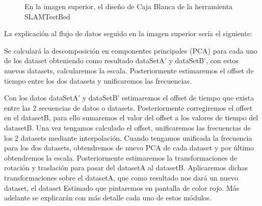 \begin{figure}[H]
\begin{center}
\hspace{0.5cm}
\end{center}
\caption{ En la imagen superior, el diseño de Caja Blanca de la herramienta SLAMTestBed }
\end{figure}

La explicación al flujo de datos seguido en la imagen superior sería el siguiente:

Se calculará la descomposición en componentes principales (PCA) para cada uno de los dataset obteniendo como resultado dataSetA' y dataSetB', con estos nuevos datasets, calcularemos la escala. Posteriormente estimaremos el offset de tiempo entre los dos datasets y unificaremos las frecuencias. 

Con los datos dataSetA' y dataSetB' estimaremos el offset de tiempo que exista entre las 2 secuencias de datos o datasets. Posteriormente corregiremos el offset en el datasetB, para ello sumaremos el valor del offset a los valores de tiempo del datasetB. Una vez tengamos calculado el offset, unificaremos las frecuencias de los 2 datasets mediante interpolación. Cuando tengamos unificada la frecuencia para los dos datasets, obtendremos de nuevo PCA de cada dataset y por último obtendremos la escala.
Posteriormente estimaremos la transformaciones de rotación y traslación para pasar del datasetA al datasetB. Aplicaremos dichas transformaciones sobre el datasetA, que como resultado nos dará un nuevo dataset, el dataset Estimado que pintaremos en pantalla de color rojo.
Más adelante se explicarán con más detalle cada uno de estos módulos.



